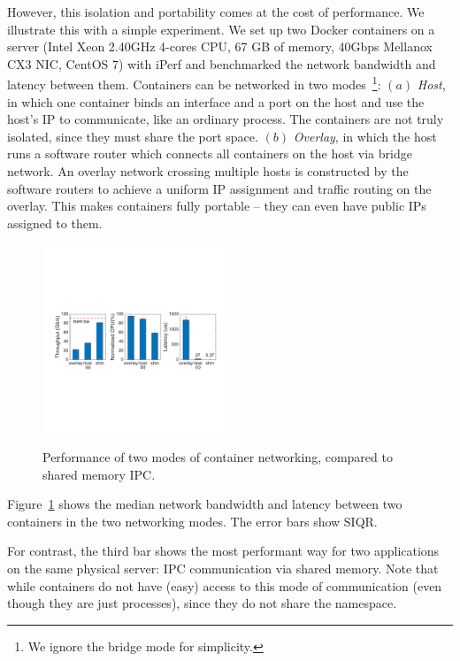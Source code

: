 However, this isolation and portability comes at the cost of performance. We
illustrate this with a simple experiment.  We set up two Docker containers on a
server (Intel Xeon 2.40GHz 4-cores CPU, 67 GB of memory, 40Gbps Mellanox CX3
NIC, CentOS 7) with iPerf and benchmarked the network bandwidth and latency
between them.  Containers can be networked in two modes~\footnote{We ignore the
bridge mode for simplicity.}: $(a)$ {\em Host}, in which one container binds an
interface and a port on the host and use the host's IP to communicate, like an
ordinary process. The containers are not truly isolated, since they must share
the port space.  $(b)$ {\em Overlay}, in which the host runs a software router
which connects all containers on the host via bridge network. An overlay network
crossing multiple hosts is constructed by the software routers to achieve a
uniform IP assignment and traffic routing on the overlay. This makes containers
fully portable -- they can even have public IPs assigned to them.

\begin{figure}[ht]
     \centering 
     \includegraphics[width=0.5\textwidth]{figures/intro/intro_exist2.pdf} 
     \label{fig:three_modes}
     \caption{Performance of two modes of container networking, compared to
     shared memory IPC.} 
\end{figure} 

Figure~\ref{fig:three_modes} shows the median network bandwidth and latency
between two containers in the two networking modes. The error bars show SIQR.

For contrast, the third bar shows the most performant way for two applications
on the same physical server: IPC communication via shared memory.  Note that
while containers do not have (easy) access to this mode of communication (even
though they are just processes), since they do not share the namespace.

